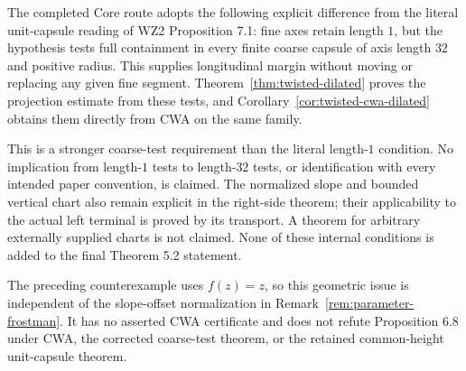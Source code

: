 \begin{remark}
\label{rem:longitudinal-tube-model}
The completed Core route adopts the following explicit difference from
the literal unit-capsule reading of WZ2 Proposition 7.1: fine axes retain
length $1$, but the hypothesis tests full containment in every finite
coarse capsule of axis length $32$ and positive radius. This supplies
longitudinal margin without moving or replacing any given fine segment.
Theorem~\ref{thm:twisted-dilated} proves the projection estimate from
these tests, and Corollary~\ref{cor:twisted-cwa-dilated} obtains them
directly from CWA on the same family.

This is a stronger coarse-test requirement than the literal length-$1$
condition. No implication from length-$1$ tests to length-$32$ tests,
or identification with every intended paper convention, is claimed.
The normalized slope and bounded vertical chart also remain explicit
in the right-side theorem; their applicability to the actual left
terminal is proved by its transport. A theorem for arbitrary externally
supplied charts is not claimed. None of these internal conditions is
added to the final Theorem 5.2 statement.

The preceding counterexample uses $f(z)=z$, so this geometric issue
is independent of the slope-offset normalization in
Remark~\ref{rem:parameter-frostman}. It has no asserted CWA certificate
and does not refute Proposition 6.8 under CWA, the corrected coarse-test
theorem, or the retained common-height unit-capsule theorem.
\end{remark}

